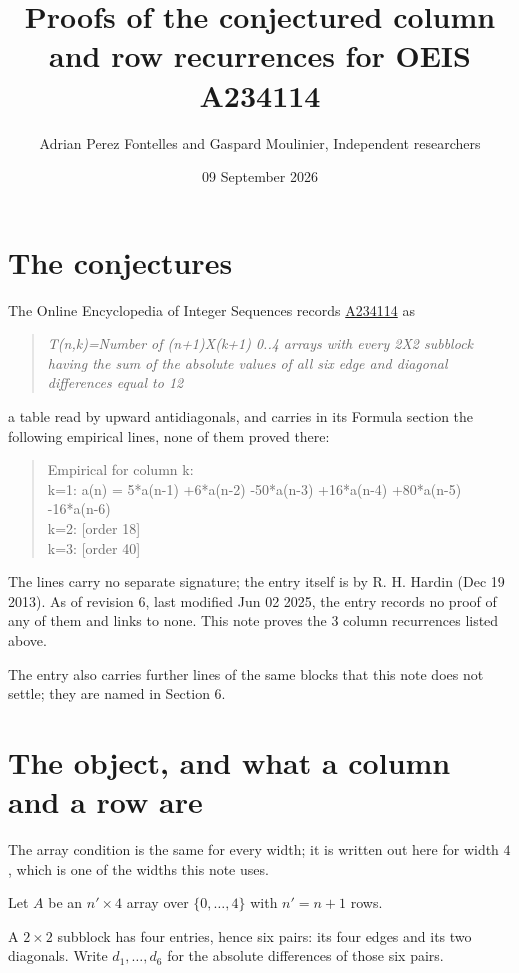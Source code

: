 \documentclass[11pt]{article}
\title{Proofs of the conjectured column and row recurrences for OEIS A234114}
\author{Adrian Perez Fontelles and Gaspard Moulinier, Independent researchers}
\date{09 September 2026}
\theoremstyle{definition}
\begin{document}
\maketitle
\section{The conjectures}

The Online Encyclopedia of Integer Sequences records \href{https://oeis.org/A234114}{A234114} as

\begin{quote}\itshape T(n,k)=Number of (n+1)X(k+1) 0..4 arrays with every 2X2 subblock having the sum of the absolute values of all six edge and diagonal differences equal to 12\end{quote}

a table read by upward antidiagonals, and carries in its Formula section the following empirical lines, none of them proved there:

\begin{quote}\ttfamily Empirical for column k:\\
k=1: a(n) = 5*a(n-1) +6*a(n-2) -50*a(n-3) +16*a(n-4) +80*a(n-5) -16*a(n-6)\\k=2: [order 18]\\k=3: [order 40]\end{quote}

The lines carry no separate signature; the entry itself is by R. H. Hardin (Dec 19 2013). As of revision 6, last modified Jun 02 2025, the entry records no proof of any of them and links to none. This note proves the 3 column recurrences listed above.

The entry also carries further lines of the same blocks that this note does not settle; they are named in Section 6.

\section{The object, and what a column and a row are}

The array condition is the same for every width; it is written out here for width $4$, which is one of the widths this note uses.

Let $A$ be an $n' \times 4$ array over $\{0,\dots,4\}$ with $n' = n + 1$ rows.

A $2\times2$ subblock has four entries, hence six pairs: its four edges and its two diagonals. Write $d_1,\dots,d_6$ for the absolute differences of those six pairs.
\end{document}
